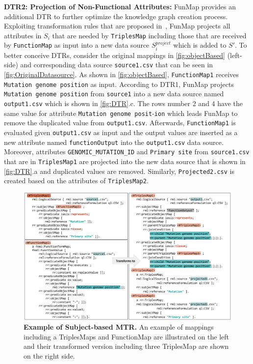 \noindent\textbf{DTR2: Projection of Non-Functional Attributes:}
FunMap provides an additional DTR to further optimize the knowledge graph creation process. Exploiting transformation rules that are proposed in~\cite{jozashoori2019mapsdi}, FunMap projects all attributes in $S_i$ that are needed by \verb|TriplesMap| including those that are received by \verb|FunctionMap| as input into a new data source $S_i^{project}$ which is added to $S'$. 
To better conceive DTRs, consider the original mappings in \autoref{fig:objectBased} (left-side) and corresponding data source \verb|source1.csv| that can be seen in \autoref{fig:OriginalDatasource}. As shown in \autoref{fig:objectBased}, \verb|FunctionMap1| receives \verb|Mutation genome position| as input. According to DTR1, FunMap projects \verb|Mutation genome position| from \verb|source1| into a new data source named \verb|output1.csv| which is shown in \autoref{fig:DTR}.c. The rows number 2 and 4 have the same value for attribute \verb|Mutation genome posit|-\verb|ion| which leads FunMap to remove the duplicated value from \verb|output1.csv|. Afterwards, \verb|FunctionMap1| is evaluated given \verb|output1.csv| as input and the output values are inserted as a new attribute named \verb|functionOutput| into the \verb|output1.csv| data source. Moreover, attributes \verb|GENOMIC_MUTATION_ID| and \verb|Primary site| from \verb|source1.csv| that are in \verb|TriplesMap1| are projected into the new data source that is shown in \autoref{fig:DTR}.a and duplicated values are removed. Similarly, \verb|Projected2.csv| is created based on the attributes of \verb|TriplesMap2|.
\begin{figure}[t!]
\includegraphics[width=\textwidth]{figures/MTR_subjectBased.png}
\caption[Example of Subject-based MTR]{\textbf{Example of Subject-based MTR.} An example of mappings including a TriplesMaps and FunctionMap are illustrated on the left and their transformed version including three TriplesMap are shown on the right side.} 
\label{fig:subjectBased}
\end{figure}
